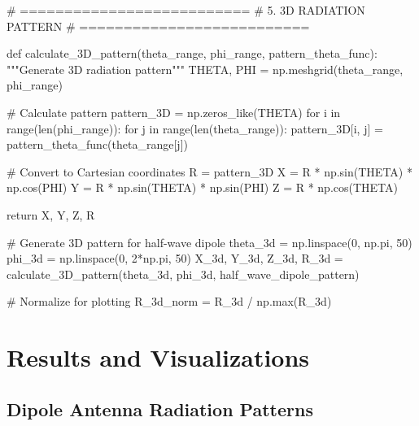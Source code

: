\documentclass[a4paper, 11pt]{article}
\begin{document}
\begin{pycode}
# ==========================
# 5. 3D RADIATION PATTERN
# ==========================

def calculate_3D_pattern(theta_range, phi_range, pattern_theta_func):
    """Generate 3D radiation pattern"""
    THETA, PHI = np.meshgrid(theta_range, phi_range)

    # Calculate pattern
    pattern_3D = np.zeros_like(THETA)
    for i in range(len(phi_range)):
        for j in range(len(theta_range)):
            pattern_3D[i, j] = pattern_theta_func(theta_range[j])

    # Convert to Cartesian coordinates
    R = pattern_3D
    X = R * np.sin(THETA) * np.cos(PHI)
    Y = R * np.sin(THETA) * np.sin(PHI)
    Z = R * np.cos(THETA)

    return X, Y, Z, R

# Generate 3D pattern for half-wave dipole
theta_3d = np.linspace(0, np.pi, 50)
phi_3d = np.linspace(0, 2*np.pi, 50)
X_3d, Y_3d, Z_3d, R_3d = calculate_3D_pattern(theta_3d, phi_3d, half_wave_dipole_pattern)

# Normalize for plotting
R_3d_norm = R_3d / np.max(R_3d)
\end{pycode}

\section{Results and Visualizations}

\subsection{Dipole Antenna Radiation Patterns}
\end{document}

